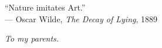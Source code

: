 \cleardoublepage
\thispagestyle{empty}

\vspace*{3cm}

\begin{raggedleft}
``Nature imitates Art.'' \\
--- Oscar Wilde, \textit{The Decay of Lying}, 1889 \\
\end{raggedleft}

\vspace{4cm+\baselineskip}

\begin{center}
\textit{To my parents.}
\end{center}
